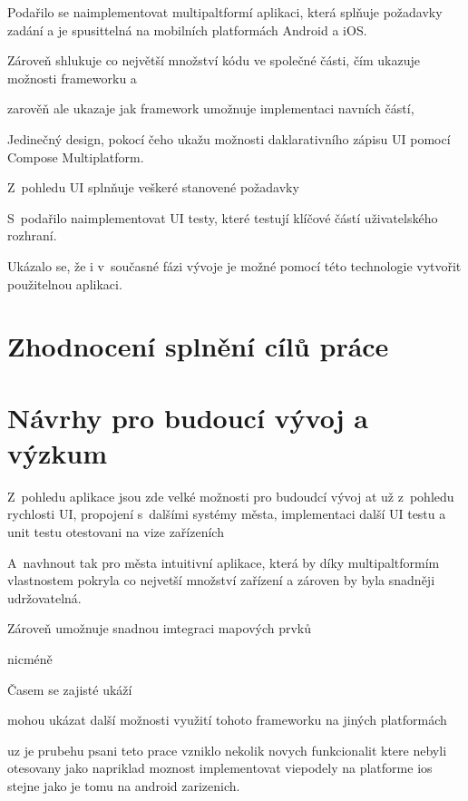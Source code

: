 Podařilo se naimplementovat multipaltformí aplikaci, která splňuje požadavky zadání a je spusittelná na mobilních 
platformách Android a iOS. 

Zároveň shlukuje co největší množství kódu ve společné části, čím ukazuje možnosti frameworku a 

zarověň ale ukazaje jak framework umožnuje implementaci navních částí, 

Jedinečný design, pokocí čeho ukažu možnosti daklarativního zápisu UI pomocí Compose Multiplatform.

Z~pohledu UI splnňuje veškeré stanovené požadavky

S~podařilo naimplementovat UI testy, které testují klíčové částí uživatelského rozhraní.

Ukázalo se, že i v~současné fázi vývoje je možné pomocí této technologie vytvořit použitelnou aplikaci.

\section{Zhodnocení splnění cílů práce}
\section{Návrhy pro budoucí vývoj a výzkum}
Z~pohledu aplikace jsou zde velké možnosti pro budoudcí vývoj 
at už z~pohledu rychlosti UI, propojení s~dalšími systémy města, implementaci další UI testu a unit testu
otestovani na vize zařízeních

A~navhnout tak pro města intuitivní aplikace, která by díky multipaltformím vlastnostem pokryla co nejvetší množství zařízení
a zároven by byla snadněji udržovatelná.

Zároveň umožnuje snadnou imtegraci mapových prvků 

nicméně 


Časem se zajisté ukáží

\bigskip

mohou ukázat další možnosti využití tohoto frameworku na jiných platformách

uz je prubehu psani teto prace vzniklo nekolik novych funkcionalit ktere nebyli otesovany jako napriklad moznost
implementovat viepodely na platforme ios stejne jako je tomu na android zarizenich.
